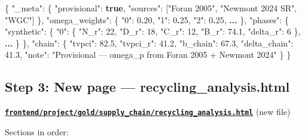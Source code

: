 \documentclass[
  11pt,
]{article}
\newenvironment{Shaded}{}{}
\newcommand{\DataTypeTok}[1]{\textcolor[rgb]{0.56,0.13,0.00}{#1}}
\newcommand{\DecValTok}[1]{\textcolor[rgb]{0.25,0.63,0.44}{#1}}
\newcommand{\ErrorTok}[1]{\textcolor[rgb]{1.00,0.00,0.00}{\textbf{#1}}}
\newcommand{\FloatTok}[1]{\textcolor[rgb]{0.25,0.63,0.44}{#1}}
\newcommand{\FunctionTok}[1]{\textcolor[rgb]{0.02,0.16,0.49}{#1}}
\newcommand{\KeywordTok}[1]{\textcolor[rgb]{0.00,0.44,0.13}{\textbf{#1}}}
\newcommand{\OtherTok}[1]{\textcolor[rgb]{0.00,0.44,0.13}{#1}}
\newcommand{\StringTok}[1]{\textcolor[rgb]{0.25,0.44,0.63}{#1}}
\begin{document}
\begin{Shaded}
\begin{Highlighting}[]
\FunctionTok{\{}
  \DataTypeTok{"\_meta"}\FunctionTok{:} \FunctionTok{\{} \DataTypeTok{"provisional"}\FunctionTok{:} \KeywordTok{true}\FunctionTok{,} \DataTypeTok{"sources"}\FunctionTok{:} \OtherTok{[}\StringTok{"Foran 2005"}\OtherTok{,} \StringTok{"Newmont 2024 SR"}\OtherTok{,} \StringTok{"WGC"}\OtherTok{]} \FunctionTok{\},}
  \DataTypeTok{"omega\_weights"}\FunctionTok{:} \FunctionTok{\{} \DataTypeTok{"0"}\FunctionTok{:} \DecValTok{0}\ErrorTok{.}\DecValTok{20}\FunctionTok{,} \DataTypeTok{"1"}\FunctionTok{:} \DecValTok{0}\ErrorTok{.}\DecValTok{25}\FunctionTok{,} \DataTypeTok{"2"}\FunctionTok{:} \DecValTok{0}\ErrorTok{.}\DecValTok{25}\FunctionTok{,} \ErrorTok{...} \FunctionTok{\},}
  \DataTypeTok{"phases"}\FunctionTok{:} \FunctionTok{\{}
    \DataTypeTok{"synthetic"}\FunctionTok{:} \FunctionTok{\{}
      \DataTypeTok{"0"}\FunctionTok{:} \FunctionTok{\{} \DataTypeTok{"N\_r"}\FunctionTok{:} \DecValTok{22}\FunctionTok{,} \DataTypeTok{"D\_r"}\FunctionTok{:} \DecValTok{18}\FunctionTok{,} \DataTypeTok{"C\_r"}\FunctionTok{:} \DecValTok{12}\FunctionTok{,} \DataTypeTok{"B\_r"}\FunctionTok{:} \FloatTok{74.1}\FunctionTok{,} \DataTypeTok{"delta\_r"}\FunctionTok{:} \DecValTok{6} \FunctionTok{\},}
      \ErrorTok{...}
    \FunctionTok{\}}
  \FunctionTok{\},}
  \DataTypeTok{"chain"}\FunctionTok{:} \FunctionTok{\{}
    \DataTypeTok{"tvpci"}\FunctionTok{:} \FloatTok{82.5}\FunctionTok{,}
    \DataTypeTok{"tvpci\_r"}\FunctionTok{:} \FloatTok{41.2}\FunctionTok{,}
    \DataTypeTok{"b\_chain"}\FunctionTok{:} \FloatTok{67.3}\FunctionTok{,}
    \DataTypeTok{"delta\_chain"}\FunctionTok{:} \FloatTok{41.3}\FunctionTok{,}
    \DataTypeTok{"note"}\FunctionTok{:} \StringTok{"Provisional — omega\_p from Foran 2005 + Newmont 2024"}
  \FunctionTok{\}}
\FunctionTok{\}}
\end{Highlighting}
\end{Shaded}

\subsection{Step 3: New page ---
recycling\_analysis.html}\label{step-3-new-page-recycling_analysis.html}

\textbf{\href{frontend/project/gold/supply_chain/recycling_analysis.html}{\texttt{frontend/project/gold/supply\_chain/recycling\_analysis.html}}}
(new file)

Sections in order:
\end{document}
